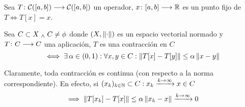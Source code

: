 \begin{defn}
	Sea $T \colon \mathcal{C}([a,b]) \longrightarrow \mathcal{C}([a,b])$ un operador, $x \colon [a,b] \longrightarrow \mathbb{R}$ es un punto fijo de $T \iff T[x]=x$.
\end{defn}
\begin{defn}[Contracción]
	Sea $C \subset X \; _{\wedge} \; C \ne \phi$ donde $(X, \left\Vert\cdot\right\Vert)$ es un espacio vectorial normado y $T \colon C \longrightarrow C$ una aplicación, $T$ es una contracción en $C$ \[\iff \exists \,\alpha \in (0,1) : \forall x, y \in C : \left\Vert T[x]-T[y]\right\Vert\leq \alpha \left\Vert x-y\right\Vert\]
\end{defn}
\begin{obs}
	Claramente, toda contracción es continua (con respecto a la norma correspondiente). En efecto, si $(x_k)_{k\in\mathbb{N}} \subset C : x_k\xrightarrow{k\to\infty} x \in C$
	\[\implies \left\Vert T[x_k]-T[x]\right\Vert\leq \alpha \left\Vert x_k-x\right\Vert \xrightarrow{k\to\infty} 0\]
\end{obs}
